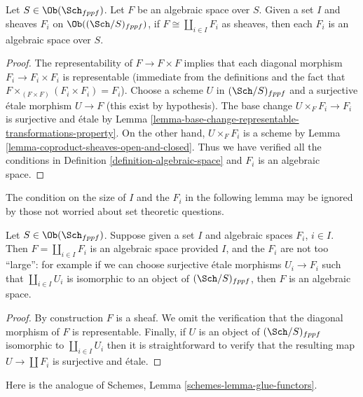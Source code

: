 \begin{lemma}
\label{lemma-algebraic-space-coproduct-sheaves}
Let $S \in \Ob(\Sch_{fppf})$.
Let $F$ be an algebraic space over $S$.
Given a set $I$ and sheaves $F_i$ on
$\Ob((\Sch/S)_{fppf})$,
if $F \cong \coprod_{i\in I} F_i$ as sheaves,
then each $F_i$ is an algebraic space over $S$.
\end{lemma}

\begin{proof}
The representability of $F \to F \times F$ implies that each diagonal morphism
$F_i \to F_i \times F_i$ is representable (immediate from the definitions
and the fact that $F \times_{(F \times F)} (F_i \times F_i) = F_i$).
Choose a scheme $U$ in $(\Sch/S)_{fppf}$ and a surjective
\'etale morphism $U \to F$ (this exist by hypothesis).
The base change $U \times_F F_i \to F_i$ is surjective and \'etale
by Lemma \ref{lemma-base-change-representable-transformations-property}.
On the other hand, $U \times_F F_i$ is a scheme by
Lemma \ref{lemma-coproduct-sheaves-open-and-closed}.
Thus we have verified all the conditions in
Definition \ref{definition-algebraic-space}
and $F_i$ is an algebraic space.
\end{proof}

\noindent
The condition on the size of $I$ and the $F_i$ in the
following lemma may be ignored by those not worried about
set theoretic questions.

\begin{lemma}
\label{lemma-coproduct-algebraic-spaces}
Let $S \in \Ob(\Sch_{fppf})$.
Suppose given a set $I$ and algebraic spaces $F_i$, $i \in I$.
Then $F = \coprod_{i \in I} F_i$ is an algebraic space
provided $I$, and the $F_i$ are not too ``large'': for example if we
can choose surjective \'etale morphisms $U_i \to F_i$ such that
$\coprod_{i \in I} U_i$ is isomorphic to an object of
$(\Sch/S)_{fppf}$, then $F$ is an algebraic space.
\end{lemma}

\begin{proof}
By construction $F$ is a sheaf. We omit the verification that the
diagonal morphism of $F$ is representable. Finally, if $U$ is an
object of $(\Sch/S)_{fppf}$ isomorphic to $\coprod_{i \in I} U_i$
then it is straightforward to verify that the resulting map
$U \to \coprod F_i$ is surjective and \'etale.
\end{proof}

\noindent
Here is the analogue of Schemes, Lemma \ref{schemes-lemma-glue-functors}.

